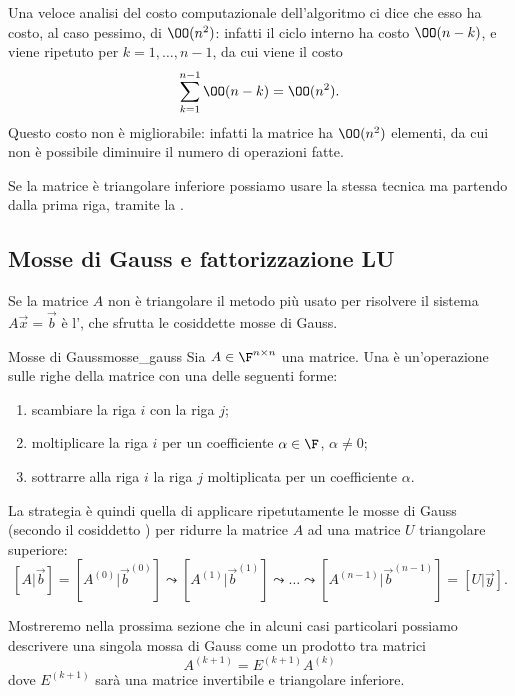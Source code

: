 Una veloce analisi del costo computazionale dell'algoritmo ci dice che esso ha costo, al caso pessimo, di $\OO(n^2)$: infatti il ciclo interno ha costo $\OO(n - k)$, e viene ripetuto per $k = 1, \dots, n-1$, da cui viene il costo \[
    \sum_{k=1}^{n-1} \OO(n-k) = \OO(n^2).
\] Questo costo non è migliorabile: infatti la matrice ha $\OO(n^2)$ elementi, da cui non è possibile diminuire il numero di operazioni fatte.

Se la matrice è triangolare inferiore possiamo usare la stessa tecnica ma partendo dalla prima riga, tramite la .

\subsection{Mosse di Gauss e fattorizzazione LU}

Se la matrice $A$ non è triangolare il metodo più usato per risolvere il sistema $A\vec x = \vec b$ è l', che sfrutta le cosiddette mosse di Gauss.

\begin{definition}
    {Mosse di Gauss}{mosse_gauss}
    Sia $A \in \Mat{\F, n, n}$ una matrice. Una  è un'operazione sulle righe della matrice con una delle seguenti forme:
    \begin{enumerate}[(1)]
        \item scambiare la riga $i$ con la riga $j$;
        \item moltiplicare la riga $i$ per un coefficiente $\alpha \in \F$, $\alpha \neq 0$;
        \item sottrarre alla riga $i$ la riga $j$ moltiplicata per un coefficiente $\alpha$.   
    \end{enumerate} 
\end{definition}

La strategia è quindi quella di applicare ripetutamente le mosse di Gauss (secondo il cosiddetto ) per ridurre la matrice $A$ ad una matrice $U$ triangolare superiore: \[
    [A | \vec b] = [A^{(0)} | \vec b^{(0)}] \leadsto [A^{(1)} | \vec b^{(1)}] \leadsto \dots \leadsto [A^{(n-1)} | \vec b^{(n-1)}] = [U | \vec y].
\]

Mostreremo nella prossima sezione che in alcuni casi particolari possiamo descrivere una singola mossa di Gauss come un prodotto tra matrici \[
    A^{(k+1)} = E^{(k+1)}A^{(k)}
\] dove $E^{(k+1)}$ sarà una matrice invertibile e triangolare inferiore.

